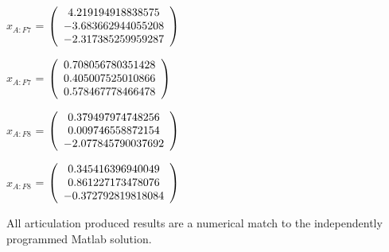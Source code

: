 \begin{description}
$x_{A:F7}$  = $\left( \begin{array} {ccc} 4.219194918838575 \\ -3.683662944055208 \\ -2.317385259959287
\end{array} \right)\\ \\$

$\hat{x}_{A:F7}$  = $\left( \begin{array} {ccc} 0.708056780351428 \\ 0.405007525010866 \\ 0.578467778466478
\end{array} \right)\\ \\$

$x_{A:F8}$  = $\left( \begin{array} {ccc} 0.379497974748256 \\ 0.009746558872154 \\ -2.077845790037692
\end{array} \right)\\ \\$

$\hat{x}_{A:F8}$  = $\left( \begin{array} {ccc} 0.345416396940049 \\ 0.861227173478076 \\ -0.372792819818084
\end{array} \right)\\ \\$

All \ModelDesc articulation produced results are a numerical match to the
independently programmed Matlab solution.

\end{description}

\label{test:art_test_2}

